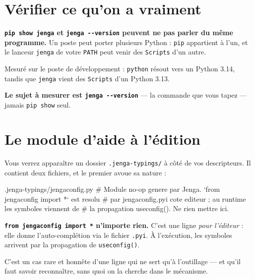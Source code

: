 \section{Vérifier ce qu'on a vraiment}


\begin{nkpiege}
\textbf{\texttt{pip show jenga} et \texttt{jenga -{}-version} peuvent ne pas
parler du même programme.} Un poste peut porter plusieurs Python : \texttt{pip}
appartient à l'un, et le lanceur \texttt{jenga} de votre \texttt{PATH} peut venir
des \texttt{Scripts} d'un autre.

Mesuré sur le poste de développement : \texttt{python} résout vers un Python
3.14, tandis que \texttt{jenga} vient des \texttt{Scripts} d'un Python 3.13.

\textbf{Le sujet à mesurer est \texttt{jenga -{}-version}} --- la commande que vous
tapez --- jamais \texttt{pip show} seul.
\end{nkpiege}

\section{Le module d'aide à l'édition}

Vous verrez apparaître un dossier \texttt{.jenga-typings/} à côté de vos
descripteurs. Il contient deux fichiers, et le premier avoue sa nature :

\begin{nkcode}{.jenga-typings/jengaconfig.py}
# Module no-op genere par Jenga. `from jengaconfig import *` est resolu
# par jengaconfig.pyi cote editeur ; au runtime les symboles viennent de
# la propagation useconfig(). Ne rien mettre ici.
\end{nkcode}

\begin{nkretenir}
\textbf{\texttt{from jengaconfig import *} n'importe rien.} C'est une ligne
\emph{pour l'éditeur} : elle donne l'auto-complétion via le fichier
\texttt{.pyi}. À l'exécution, les symboles arrivent par la propagation de
\texttt{useconfig()}.

C'est un cas rare et honnête d'une ligne qui ne sert qu'à l'outillage --- et
qu'il faut savoir reconnaître, sans quoi on la cherche dans le mécanisme.
\end{nkretenir}

